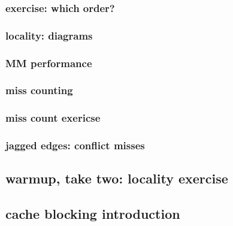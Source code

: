 \subsubsection{exercise: which order?}

\subsubsection{locality: diagrams}



\subsubsection{MM performance}


\subsubsection{miss counting}


\subsubsection{miss count exericse}


\subsubsection{jagged edges: conflict misses} %



\subsection{warmup, take two: locality exercise}


\subsection{cache blocking introduction}
%
